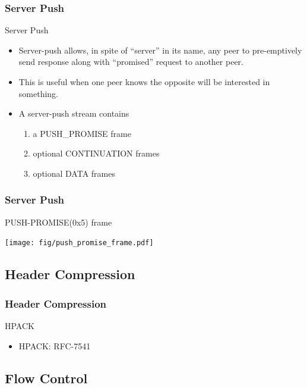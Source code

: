 \documentclass[lualatex]{beamer}
\begin{document}
\begin{frame}
  \frametitle{Server Push}

  \begin{block}{Server Push}
    \begin{itemize}
    \item Server-push allows, in spite of ``server'' in its name, any peer to pre-emptively send response along with ``promised'' request to another peer.
    \item This is useful when one peer knows the opposite will be interested in something.
    \item A server-push stream contains
      \begin{enumerate}
      \item a PUSH\_PROMISE frame
      \item optional CONTINUATION frames
      \item optional DATA frames
      \end{enumerate}
    \end{itemize}
  \end{block}
\end{frame}

\begin{frame}
  \frametitle{Server Push}

  \begin{block}{PUSH-PROMISE(0x5) frame}
    \begin{center}
      \texttt{[image: fig/push\_promise\_frame.pdf]}
    \end{center}
  \end{block}
\end{frame}

\subsection{Header Compression}

\begin{frame}
  \frametitle{Header Compression}
  \begin{block}{HPACK}
    \begin{itemize}
    \item HPACK: RFC-7541
    \end{itemize}
  \end{block}
\end{frame}

\subsection{Flow Control}
\end{document}
